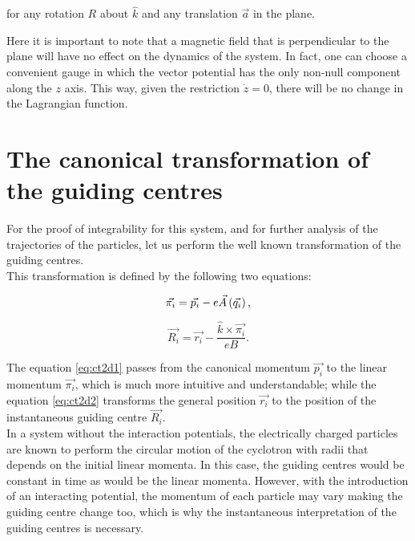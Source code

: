 for any rotation $R$ about $\hat{k}$ and any translation $\vec{a}$ in the plane.

Here it is important to note that a magnetic field that is perpendicular to the plane will have no effect on the dynamics of the system. In fact, one can choose a convenient gauge in which the vector potential has the only non-null component along the $z$ axis. This way, given the restriction $\dot{z} = 0$, there will be no change in the Lagrangian function.\\

\section{The canonical transformation of the guiding centres}

For the proof of integrability for this system, and for further analysis of the trajectories of the particles, let us perform the well known transformation of the guiding centres.\\

This transformation is defined by the following two equations:

\begin{equation}
\vec{\pi_i} = \vec{p_i} - e\vec{A}\left( \vec{q_i} \right),
\label{eq:ct2d1}
\end{equation}

\begin{equation}
\vec{R_i} = \vec{r_i} - \frac{\hat{k}\times\vec{\pi_i}}{eB}.
\label{eq:ct2d2}
\end{equation}

The equation \eqref{eq:ct2d1} passes from the canonical momentum $\vec{p_i}$ to the linear momentum $\vec{\pi_i}$, which is much more intuitive and understandable; while the equation \eqref{eq:ct2d2} transforms the general position  $\vec{r_i}$ to the position of the instantaneous guiding centre $\vec{R_i}$.\\

In a system without the interaction potentials, the electrically charged particles are known to perform the circular motion of the cyclotron with radii that depends on the initial linear momenta. In this case, the guiding centres would be constant in time as would be the linear momenta. However, with the introduction of an interacting potential, the momentum of each particle may vary making the guiding centre change too, which is why the instantaneous interpretation of the guiding centres is necessary.\\

